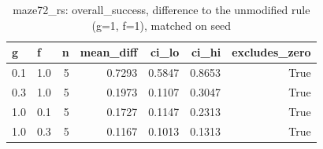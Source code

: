 \begin{table}[t]
\centering
\small
\begin{tabular}{llrrrrr}
\toprule
g & f & n & mean\_diff & ci\_lo & ci\_hi & excludes\_zero \\
\midrule
0.1 & 1.0 & 5 & 0.7293 & 0.5847 & 0.8653 & True \\
0.3 & 1.0 & 5 & 0.1973 & 0.1107 & 0.3047 & True \\
1.0 & 0.1 & 5 & 0.1727 & 0.1147 & 0.2313 & True \\
1.0 & 0.3 & 5 & 0.1167 & 0.1013 & 0.1313 & True \\
\bottomrule
\end{tabular}
\caption{maze72\_rs: overall\_success, difference to the unmodified rule (g=1, f=1), matched on seed}
\label{tab:plasticity_maze72_rs_overall_success_paired}
\end{table}